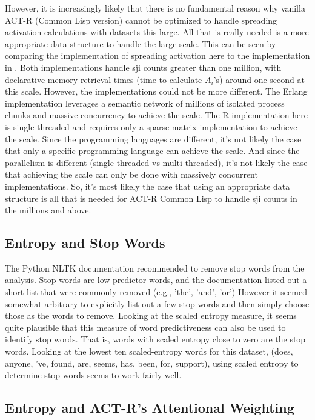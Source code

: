 \documentclass[10pt,letterpaper]{article}
\begin{document}
However, it is increasingly likely that there is no fundamental reason why vanilla ACT-R (Common Lisp version) cannot be optimized to handle spreading activation calculations with datasets this large.
All that is really needed is a more appropriate data structure to handle the large scale.
This can be seen by comparing the implementation of spreading activation here to the implementation in .
Both implementations handle sji counts greater than one million, with declarative memory retrieval times (time to calculate $A_{i}$'s) around one second at this scale.
However, the implementations could not be more different.
The Erlang implementation leverages a semantic network of millions of isolated process chunks and massive concurrency to achieve the scale.
The R implementation here is single threaded and requires only a sparse matrix implementation to achieve the scale.
Since the programming languages are different, it's not likely the case that only a specific programming language can achieve the scale.
And since the parallelism is different (single threaded vs multi threaded), it's not likely the case that achieving the scale can only be done with massively concurrent implementations.
So, it's most likely the case that using an appropriate data structure is all that is needed for ACT-R Common Lisp to handle sji counts in the millions and above.

\subsection{Entropy and Stop Words}

The Python NLTK documentation \cite{Bird2009} recommended to remove stop words from the analysis.
Stop words are low-predictor words, and the documentation listed out a short list that were commonly removed (e.g., 'the', 'and', 'or')
However it seemed somewhat arbitrary to explicitly list out a few stop words and then simply choose those as the words to remove.
Looking at the scaled entropy measure, it seems quite plausible that this measure of word predictiveness can also be used to identify stop words.
That is, words with scaled entropy close to zero are the stop words.
Looking at the lowest ten scaled-entropy words for this dataset, (does, anyone, 've, found, are, seems, has, been, for, support), using scaled entropy to determine stop words seems to work fairly well.

\subsection{Entropy and ACT-R's Attentional Weighting}
\end{document}
